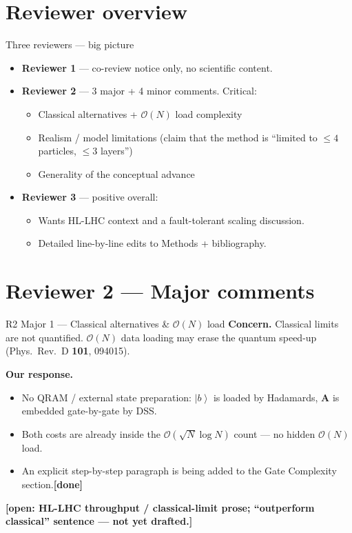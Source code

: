 \documentclass[aspectratio=169]{beamer}
\providecommand{\ket}[1]{\left|#1\right\rangle}
\newcommand{\openflag}[1]{{\color{orange}\textbf{[open: #1]}}}
\newcommand{\done}{{\color{teal}\textbf{[done]}}}
\begin{document}
\section{Reviewer overview}

\begin{frame}{Three reviewers --- big picture}
\begin{itemize}
  \item \textbf{Reviewer 1} --- co-review notice only, no scientific content.
  \item \textbf{Reviewer 2} --- 3 major + 4 minor comments. Critical:
  \begin{itemize}\footnotesize
    \item Classical alternatives + $\mathcal{O}(N)$ load complexity
    \item Realism / model limitations (claim that the method is ``limited to $\le 4$ particles, $\le 3$ layers'')
    \item Generality of the conceptual advance
  \end{itemize}
  \item \textbf{Reviewer 3} --- positive overall:
  \begin{itemize}\footnotesize
    \item Wants HL-LHC context and a fault-tolerant scaling discussion.
    \item Detailed line-by-line edits to Methods + bibliography.
  \end{itemize}
\end{itemize}
\end{frame}

\section{Reviewer 2 --- Major comments}

\begin{frame}{R2 Major 1 --- Classical alternatives \& $\mathcal{O}(N)$ load}
\textbf{Concern.} Classical limits are not quantified. $\mathcal{O}(N)$ data loading may erase the quantum speed-up
{\footnotesize (Phys.\ Rev.\ D \textbf{101}, 094015)}.
\smallskip

\textbf{Our response.}
\begin{itemize}
  \item No QRAM / external state preparation: $\ket b$ is loaded by Hadamards, $\mathbf A$ is embedded gate-by-gate by DSS.
  \item Both costs are already inside the $\mathcal{O}(\sqrt{N}\log N)$ count --- no hidden $\mathcal{O}(N)$ load.
  \item An explicit step-by-step paragraph is being added to the Gate Complexity section.\hfill\done
\end{itemize}
\smallskip
\openflag{HL-LHC throughput / classical-limit prose; ``outperform classical'' sentence --- not yet drafted.}
\end{frame}
\end{document}
